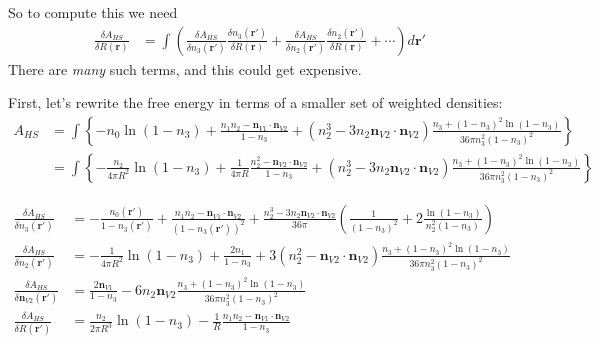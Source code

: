\documentclass[letterpaper,twocolumn,amsmath,amssymb,prb]{revtex4-1}
\newcommand{\derivation}[1]{#1} %
\begin{document}
\derivation{
  So to compute this we need
  \begin{align}
    \frac{\delta A_{HS}}{\delta R(\mathbf{r})} &=
    \int \left(
    \frac{\delta A_{HS}}{\delta n_3(\mathbf{r}')}
    \frac{\delta n_3(\mathbf{r}')}{\delta R(\mathbf{r})}
    +
    \frac{\delta A_{HS}}{\delta n_2(\mathbf{r}')}
    \frac{\delta n_2(\mathbf{r}')}{\delta R(\mathbf{r})}
    + \cdots
    \right) d\mathbf{r}'
  \end{align}
  There are \emph{many} such terms, and this could get expensive.
  
  First, let's rewrite the free energy in terms of a smaller set of
  weighted densities:
  \begin{align}
    A_{HS} &= \int \left\{
    -n_0 \ln\left( 1 - n_3\right)
    + \frac{n_1 n_2 - \mathbf{n}_{V1} \cdot\mathbf{n}_{V2}}{1-n_3}
    + (n_2^3 - 3 n_2 \mathbf{n}_{V2} \cdot \mathbf{n}_{V2}) \frac{
      n_3 + (1-n_3)^2 \ln(1-n_3)
    }{
      36\pi n_3^2(1-n_3)^2
    }
    \right\}
    \\
    &= \int \left\{
    -\frac{n_2}{4\pi R^2} \ln\left( 1 - n_3\right)
    + \frac{1}{4\pi R} \frac{n_2^2 - \mathbf{n}_{V2} \cdot\mathbf{n}_{V2}}{1-n_3}
    + (n_2^3 - 3 n_2 \mathbf{n}_{V2} \cdot \mathbf{n}_{V2}) \frac{
      n_3 + (1-n_3)^2 \ln(1-n_3)
    }{
      36\pi n_3^2(1-n_3)^2
    }
    \right\}
  \end{align}
  
  \begin{align}
    \frac{\delta A_{HS}}{\delta n_3(\mathbf{r}')} &=
    -\frac{n_0(\mathbf{r}')}{1 - n_3(\mathbf{r}')}
    + \frac{n_1n_2 - \mathbf{n}_{V1}\cdot\mathbf{n}_{V2}}{(1 -
      n_3(\mathbf{r}'))^2}
    + \frac{n_2^3 -
      3n_2\mathbf{n}_{V2}\cdot\mathbf{n}_{V2}}{36\pi}\left(
    \frac{1}{(1-n_3)^2} + 2\frac{\ln(1-n_3)}{n_2^2(1-n_3)}
    \right)
    \\
    \frac{\delta A_{HS}}{\delta n_2(\mathbf{r}')} &=
    -\frac{1}{4\pi R^2} \ln\left( 1 - n_3\right)
    +  \frac{2n_1}{1-n_3}
    + 3(n_2^2 - \mathbf{n}_{V2}\cdot\mathbf{n}_{V2})\frac{n_3 +
      (1-n_3)^2\ln(1-n_3)}{
      36\pi n_3^2(1-n_3)^2
    }
    \\
    \frac{\delta A_{HS}}{\delta \mathbf{n}_{V2}(\mathbf{r}')} &=
    \frac{2\mathbf{n}_{V1}}{1-n_3}
    - 6 n_2 \mathbf{n}_{V2} \frac{n_3 +
      (1-n_3)^2\ln(1-n_3)}{
      36\pi n_3^2(1-n_3)^2
    }    \\
    \frac{\delta A_{HS}}{\delta R(\mathbf{r}')} &=
    \frac{n_2}{2\pi R^3} \ln\left( 1 - n_3\right)
    - \frac1{R} \frac{n_1n_2 - \mathbf{n}_{V1} \cdot\mathbf{n}_{V2}}{1-n_3}
  \end{align}
  
}
\end{document}
